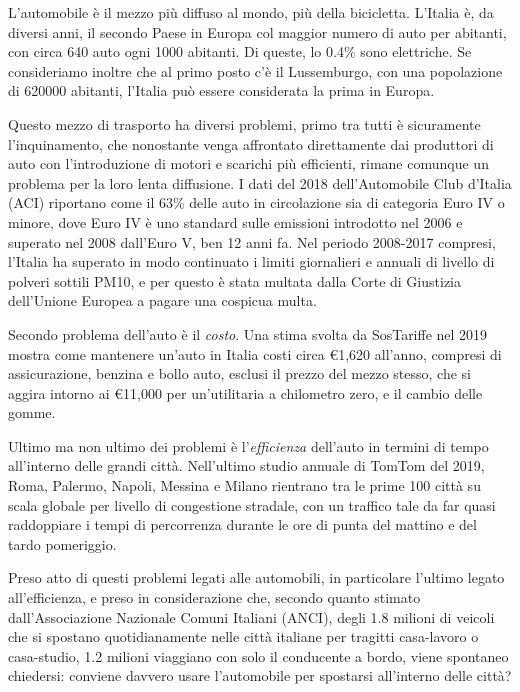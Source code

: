 L'automobile è il mezzo più diffuso al mondo, più della bicicletta. L'Italia è, da diversi anni, il secondo Paese in Europa col maggior numero di auto per abitanti, con circa 640 auto ogni 1000 abitanti\cite{eurostatcars}. Di queste, lo 0.4\% sono elettriche\cite{anfiastudiestatistiche}. Se consideriamo inoltre che al primo posto c'è il Lussemburgo, con una popolazione di 620000 abitanti, l'Italia può essere considerata la prima in Europa.

Questo mezzo di trasporto ha diversi problemi, primo tra tutti è sicuramente l'inquinamento, che nonostante venga affrontato direttamente dai produttori di auto con l'introduzione di motori e scarichi più efficienti, rimane comunque un problema per la loro lenta diffusione. I dati del 2018 dell'Automobile Club d'Italia (ACI) riportano come il 63\% delle auto in circolazione sia di categoria Euro IV o minore\cite{anfiastudiestatistiche}, dove Euro IV è uno standard sulle emissioni introdotto nel 2006 e superato nel 2008 dall'Euro V, ben 12 anni fa\cite{euroivstandard}. Nel periodo 2008-2017 compresi, l'Italia ha superato in modo continuato i limiti giornalieri e annuali di livello di polveri sottili PM10, e per questo è stata multata dalla Corte di Giustizia dell'Unione Europea a pagare una cospicua multa\cite{eunewssanzioneitalia}.

Secondo problema dell'auto è il \emph{costo}. Una stima svolta da SosTariffe nel 2019 mostra come mantenere un'auto in Italia costi circa €1,620 all'anno, compresi di assicurazione, benzina e bollo auto, esclusi il prezzo del mezzo stesso, che si aggira intorno ai €11,000 per un'utilitaria a chilometro zero, e il cambio delle gomme\cite{sostariffe}.

Ultimo ma non ultimo dei problemi è l'\emph{efficienza} dell'auto in termini di tempo all'interno delle grandi città. Nell'ultimo studio annuale di TomTom del 2019\cite{tomtomindexmilan}, Roma, Palermo, Napoli, Messina e Milano rientrano tra le prime 100 città su scala globale per livello di congestione stradale, con un traffico tale da far quasi raddoppiare i tempi di percorrenza durante le ore di punta del mattino e del tardo pomeriggio.

Preso atto di questi problemi legati alle automobili, in particolare l'ultimo legato all'efficienza, e preso in considerazione che, secondo quanto stimato dall'Associazione Nazionale Comuni Italiani (ANCI), degli 1.8 milioni di veicoli che si spostano quotidianamente nelle città italiane per tragitti casa-lavoro o casa-studio, 1.2 milioni viaggiano con solo il conducente a bordo\cite{anciperrepubblica}, viene spontaneo chiedersi: conviene davvero usare l'automobile per spostarsi all'interno delle città?
